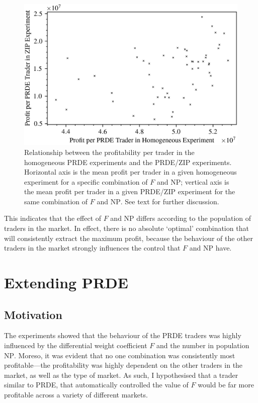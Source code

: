 \documentclass[conference]{IEEEtran}
\begin{document}
\begin{figure}[htbp]
    \centerline{\includegraphics[width=\columnwidth]{homo_zip_scatter.png}}
    \caption{
        Relationship between the profitability per trader in the homogeneous PRDE experiments and the PRDE/ZIP experiments.
        Horizontal axis is the mean profit per trader in a given homogeneous experiment for a specific combination of $F$ and $\mathrm{NP}$; vertical axis is the mean profit per trader in a given PRDE/ZIP experiment for the same combination of $F$ and $\mathrm{NP}$.
        See text for further discussion.
    }
    \label{homo_zip_scatter}
\end{figure}

This indicates that the effect of $F$ and $\mathrm{NP}$ differs according to the population of traders in the market.
In effect, there is no absolute `optimal' combination that will consistently extract the maximum profit, because the behaviour of the other traders in the market strongly influences the control that $F$ and $\mathrm{NP}$ have.

\section{Extending PRDE}

\subsection{Motivation}

The experiments showed that the behaviour of the PRDE traders was highly influenced by the differential weight coefficient $F$ and the number in population $\mathrm{NP}$.
Moreso, it was evident that no one combination was consistently most profitable---the profitability was highly dependent on the other traders in the market, as well as the type of market.
As such, I hypothesised that a trader similar to PRDE, that automatically controlled the value of $F$ would be far more profitable across a variety of different markets.
\end{document}
